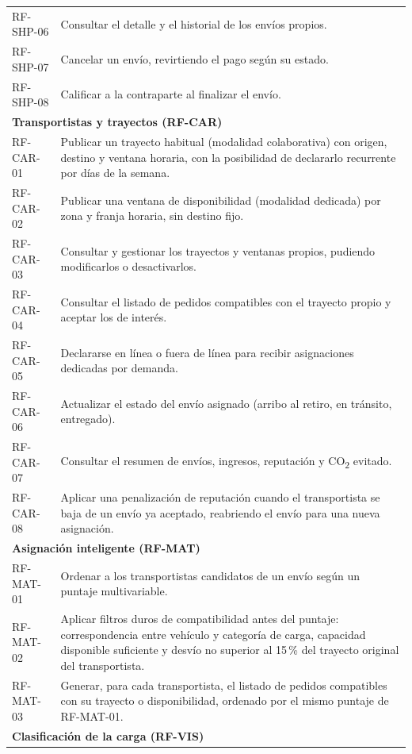 {\begin{longtable}{p{2.4cm}p{11.2cm}}
    RF-SHP-06 & Consultar el detalle y el historial de los envíos propios. \\
    RF-SHP-07 & Cancelar un envío, revirtiendo el pago según su estado. \\
    RF-SHP-08 & Calificar a la contraparte al finalizar el envío. \\
    \midrule
    \multicolumn{2}{l}{\textbf{Transportistas y trayectos (RF-CAR)}} \\
    RF-CAR-01 & Publicar un trayecto habitual (modalidad colaborativa) con origen, destino y ventana horaria, con la posibilidad de declararlo recurrente por días de la semana. \\
    RF-CAR-02 & Publicar una ventana de disponibilidad (modalidad dedicada) por zona y franja horaria, sin destino fijo. \\
    RF-CAR-03 & Consultar y gestionar los trayectos y ventanas propios, pudiendo modificarlos o desactivarlos. \\
    RF-CAR-04 & Consultar el listado de pedidos compatibles con el trayecto propio y aceptar los de interés. \\
    RF-CAR-05 & Declararse en línea o fuera de línea para recibir asignaciones dedicadas por demanda. \\
    RF-CAR-06 & Actualizar el estado del envío asignado (arribo al retiro, en tránsito, entregado). \\
    RF-CAR-07 & Consultar el resumen de envíos, ingresos, reputación y CO\textsubscript{2} evitado. \\
    RF-CAR-08 & Aplicar una penalización de reputación cuando el transportista se baja de un envío ya aceptado, reabriendo el envío para una nueva asignación. \\
    \midrule
    \multicolumn{2}{l}{\textbf{Asignación inteligente (RF-MAT)}} \\
    RF-MAT-01 & Ordenar a los transportistas candidatos de un envío según un puntaje multivariable. \\
    RF-MAT-02 & Aplicar filtros duros de compatibilidad antes del puntaje: correspondencia entre vehículo y categoría de carga, capacidad disponible suficiente y desvío no superior al 15\,\% del trayecto original del transportista. \\
    RF-MAT-03 & Generar, para cada transportista, el listado de pedidos compatibles con su trayecto o disponibilidad, ordenado por el mismo puntaje de RF-MAT-01. \\
    \midrule
    \multicolumn{2}{l}{\textbf{Clasificación de la carga (RF-VIS)}} \\

\end{longtable}}
